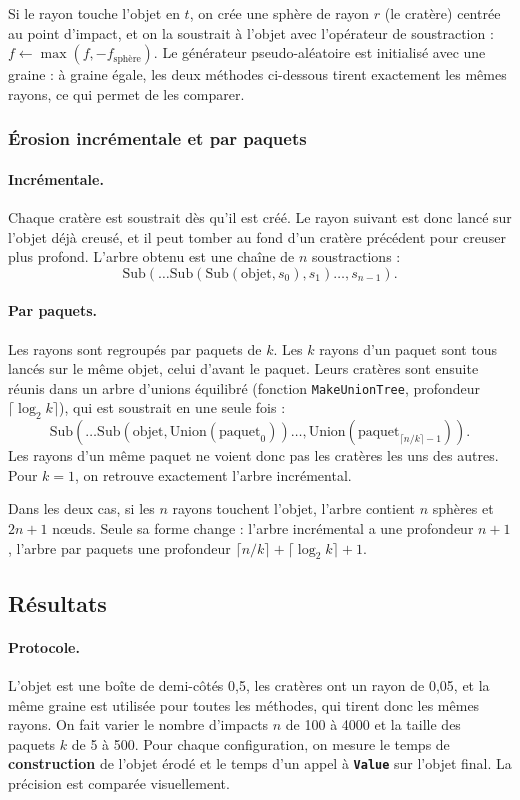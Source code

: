 \documentclass[11pt,a4paper]{article}
\begin{document}
Si le rayon touche l'objet en $t$, on crée une sphère de rayon $r$ (le cratère) centrée au point d'impact, et on la soustrait à l'objet avec l'opérateur de soustraction : $f \leftarrow \max(f, -f_{\text{sphère}})$. Le générateur pseudo-aléatoire est initialisé avec une graine : à graine égale, les deux méthodes ci-dessous tirent exactement les mêmes rayons, ce qui permet de les comparer.

\subsubsection{Érosion incrémentale et par paquets}
\paragraph{Incrémentale.} Chaque cratère est soustrait dès qu'il est créé. Le rayon suivant est donc lancé sur l'objet déjà creusé, et il peut tomber au fond d'un cratère précédent pour creuser plus profond. L'arbre obtenu est une chaîne de $n$ soustractions :
\[
  \mathrm{Sub}(\dots\mathrm{Sub}(\mathrm{Sub}(\text{objet}, s_0), s_1)\dots, s_{n-1}).
\]

\paragraph{Par paquets.} Les rayons sont regroupés par paquets de $k$. Les $k$ rayons d'un paquet sont tous lancés sur le même objet, celui d'avant le paquet. Leurs cratères sont ensuite réunis dans un arbre d'unions équilibré (fonction \texttt{MakeUnionTree}, profondeur $\lceil\log_2 k\rceil$), qui est soustrait en une seule fois :
\[
  \mathrm{Sub}(\dots\mathrm{Sub}(\text{objet}, \mathrm{Union}(\text{paquet}_0))\dots, \mathrm{Union}(\text{paquet}_{\lceil n/k\rceil-1})).
\]
Les rayons d'un même paquet ne voient donc pas les cratères les uns des autres. Pour $k = 1$, on retrouve exactement l'arbre incrémental.

Dans les deux cas, si les $n$ rayons touchent l'objet, l'arbre contient $n$ sphères et $2n+1$ nœuds. Seule sa forme change : l'arbre incrémental a une profondeur $n+1$, l'arbre par paquets une profondeur $\lceil n/k\rceil + \lceil\log_2 k\rceil + 1$.

\subsection{Résultats}
\paragraph{Protocole.} L'objet est une boîte de demi-côtés 0,5, les cratères ont un rayon de 0,05, et la même graine est utilisée pour toutes les méthodes, qui tirent donc les mêmes rayons. On fait varier le nombre d'impacts $n$ de 100 à 4000 et la taille des paquets $k$ de 5 à 500. Pour chaque configuration, on mesure le temps de \textbf{construction} de l'objet érodé et le temps d'un appel à \textbf{\texttt{Value}} sur l'objet final. La précision est comparée visuellement.
\end{document}
